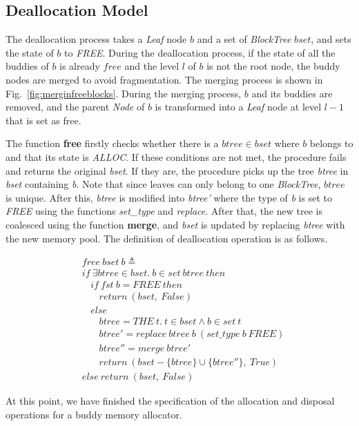\subsection{Deallocation Model}
The deallocation process takes a \emph{Leaf} node $b$ and a set of \emph{BlockTree} $bset$, and sets the state of $b$ to \emph{FREE}. During the deallocation process, if the state of all the buddies of $b$ is already $free$ and the level $l$ of $b$ is not the root node, the buddy nodes are merged to avoid fragmentation. The merging process is shown in Fig.~\ref{fig:merginfreeblocks}. During the merging process, $b$ and its buddies are removed, and the parent \emph{Node} of $b$ is transformed into a \emph{Leaf} node at level $l - 1$ that is set as free.

The function \textbf{free} firstly checks whether there is a $btree \in bset$ where $b$ belongs to and that its state is \emph{ALLOC}. If these conditions are not met, the procedure fails and returns the original \emph{bset}. If they are, the procedure picks up the tree \emph{btree} in \emph{bset} containing \emph{b}. Note that since leaves can only belong to one \emph{BlockTree}, $btree$ is unique. After this, \emph{btree} is modified into \emph{btree'} where the type of \emph{b} is set to \emph{FREE} using the functions \emph{set\_type} and \emph{replace}. After that, the new tree is coalesced using the function \textbf{merge}, and \emph{bset} is updated by replacing \emph{btree} with the new memory pool. The definition of deallocation operation is as follows.

\begin{definition} 
	\begin{align*}
	&free\ bset\ b \triangleq \\
	&if\ \exists btree \in bset.\ b \in set\ btree\ then \\
	&\ \ \ \ if\ fst\ b = FREE\ then \\
	&\ \ \ \ \ \ \ \ return\ (bset,\ False) \\
	&\ \ \ \ else \\
	&\ \ \ \ \ \ \ \ btree = THE\ t.\ t \in bset \wedge b \in set\ t \\
	&\ \ \ \ \ \ \ \ btree' = replace\ btree\ b\ (set\_type\ b\ FREE) \\
	&\ \ \ \ \ \ \ \ btree'' = merge\ btree' \\
	&\ \ \ \ \ \ \ \ return\ (bset - \lbrace btree \rbrace \cup \lbrace btree'' \rbrace,\ True) \\
	&else\ return\ (bset,\ False)
	\end{align*}
\end{definition}

At this point, we have finished the specification of the allocation and disposal operations for a buddy memory allocator. 